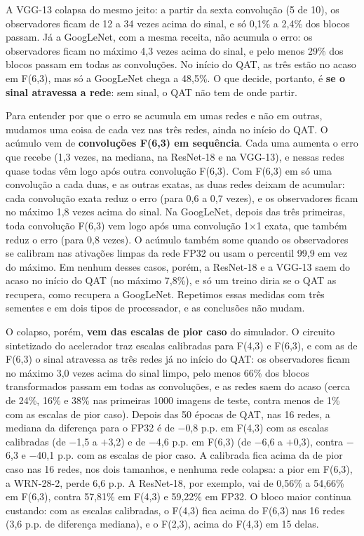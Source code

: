\documentclass[conference]{IEEEtran}
\newcommand{\by}{\ensuremath{\times}}
\begin{document}
A VGG-13 colapsa do mesmo jeito: a partir da sexta convolução (5 de 10), os observadores
ficam de 12 a 34 vezes acima do sinal, e só 0,1\% a 2,4\% dos blocos passam. Já a GoogLeNet, com a mesma receita, não acumula o erro: os observadores
ficam no máximo 4,3 vezes acima do sinal, e pelo menos 29\% dos blocos passam em todas as convoluções. No início do QAT, as três estão no acaso em
F(6,3), mas só a GoogLeNet chega a 48,5\%. O que decide, portanto, é \textbf{se o sinal atravessa a rede}: sem sinal, o QAT não tem de onde partir.

Para entender por que o erro se acumula em umas redes e não em outras, mudamos uma coisa de cada vez nas três redes, ainda no início do QAT. O acúmulo
vem de \textbf{convoluções F(6,3) em sequência}. Cada uma aumenta o erro que recebe (1,3 vezes, na mediana, na ResNet-18 e na VGG-13), e nessas redes
quase todas vêm logo após outra convolução F(6,3). Com F(6,3) em só uma convolução a cada duas, e as outras exatas, as duas redes deixam de acumular:
cada convolução exata reduz o erro (para 0,6 a 0,7 vezes), e os observadores ficam no máximo 1,8 vezes acima do sinal. Na GoogLeNet, depois das três
primeiras, toda convolução F(6,3) vem logo após uma convolução 1\by1 exata, que também reduz o erro (para 0,8 vezes). O acúmulo também some quando os
observadores se calibram nas ativações limpas da rede FP32 ou usam o percentil 99,9 em vez do máximo. Em nenhum desses casos, porém, a ResNet-18 e a
VGG-13 saem do acaso no início do QAT (no máximo 7,8\%), e só um treino diria se o QAT as recupera, como recupera a GoogLeNet. Repetimos essas medidas
com três sementes e em dois tipos de processador, e as conclusões não mudam.

O colapso, porém, \textbf{vem das escalas de pior caso} do simulador. O circuito sintetizado do acelerador traz escalas calibradas para F(4,3) e F(6,3), e com as de F(6,3)
o sinal atravessa as três redes já no início do QAT: os observadores ficam no máximo 3,0 vezes acima do sinal limpo, pelo menos 66\% dos blocos transformados
passam em todas as convoluções, e as redes saem do acaso (cerca de 24\%, 16\% e 38\% nas primeiras 1000 imagens de teste, contra menos de 1\% com as escalas de pior caso).
Depois das 50 épocas de QAT, nas 16 redes, a mediana da diferença para o FP32 é de $-$0,8 p.p. em F(4,3) com as escalas calibradas (de $-$1,5 a $+$3,2) e de
$-$4,6 p.p. em F(6,3) (de $-$6,6 a $+$0,3), contra $-$6,3 e $-$40,1 p.p. com as escalas de pior caso. A calibrada fica acima da de pior caso nas 16 redes, nos dois
tamanhos, e nenhuma rede colapsa: a pior em F(6,3), a WRN-28-2, perde 6,6 p.p. A ResNet-18, por exemplo, vai de 0,56\% a 54,66\% em F(6,3), contra 57,81\% em F(4,3)
e 59,22\% em FP32. O bloco maior continua custando: com as escalas calibradas, o F(4,3) fica acima do F(6,3) nas 16 redes (3,6 p.p. de diferença mediana), e o
F(2,3), acima do F(4,3) em 15 delas.
\end{document}
